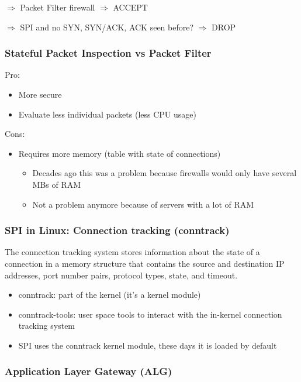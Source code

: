 \documentclass{article}
\begin{document}
$\Rightarrow$ Packet Filter firewall $\Rightarrow$ ACCEPT

$\Rightarrow$ SPI and no SYN, SYN/ACK, ACK seen before? $\Rightarrow$ DROP


\subsubsection{Stateful Packet Inspection vs Packet Filter}

Pro:

\begin{itemize}
    \item More secure
    \item Evaluate less individual packets (less CPU usage)
\end{itemize}

Cons:

\begin{itemize}
    \item Requires more memory (table with state of connections)
    \begin{itemize}
        \item Decades ago this was a problem because firewalls would only have several MBs of RAM
        \item Not a problem anymore because of servers with a lot of RAM
    \end{itemize}
\end{itemize}

\subsubsection{SPI in Linux: Connection tracking (conntrack)}

The connection tracking system stores information 
about the state of a connection in a memory structure that 
contains the source and destination IP addresses, port number pairs, 
protocol types, state, and timeout.

\begin{itemize}
    \item conntrack: part of the kernel (it's a kernel module)
    \item conntrack-tools: user space tools to interact with the in-kernel connection tracking system
    \item SPI uses the conntrack kernel module, these days it is loaded by default
\end{itemize}

\subsubsection{Application Layer Gateway (ALG)}
\end{document}
